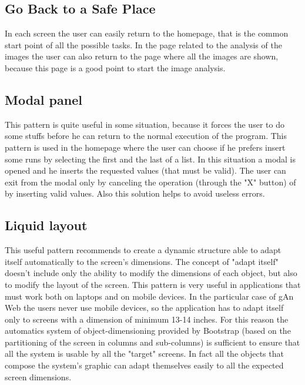 \subsection{Go Back to a Safe Place}
In each screen the user can easily return to the homepage, that is the common start point of all the possible tasks. In the page related to the analysis of the images the user can also return to the page where all the images are shown, because this page is a good point to start the image analysis.

\subsection{Modal panel}
This pattern is quite useful in some situation, because it forces the user to do some stuffs before he can return to the normal execution of the program. This pattern is used in the homepage where the user can choose if he prefers insert some runs by selecting the first and the last of a list. In this situation a modal is opened and he inserts the requested values (that must be valid). The user can exit from the modal only by canceling the operation (through the "X" button) of by inserting valid values. Also this solution helps to avoid useless errors. 

\subsection{Liquid layout}

This useful pattern recommends to create a dynamic structure able to adapt itself automatically to the screen's dimensions. The concept of "adapt itself" doesn't include only the ability to modify the dimensions of each object, but also to modify the layout of the screen. This pattern is very useful in applications that must work both on laptops and on mobile devices. In the particular case of gAn Web the users never use mobile devices, so the application has to adapt itself only to screens with a dimension of minimum 13-14 inches. For this reason the automatics system of object-dimensioning provided by Bootstrap (based on the partitioning of the screen in columns and sub-columns) is sufficient to ensure that all the system is usable by all the "target" screens. In fact all the objects that compose the system's graphic can adapt themselves easily to all the expected screen dimensions. 




 